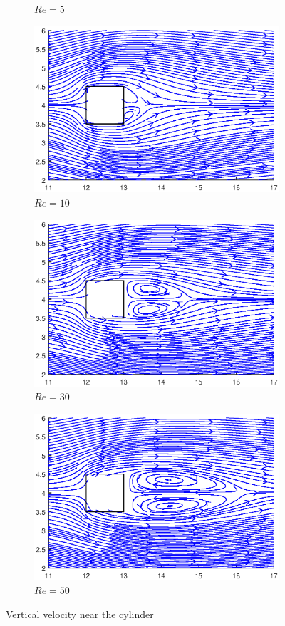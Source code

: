 \begin{figure}[h]
\begin{subfigure}{0.5\textwidth}
		\caption{$Re=5$}
	\end{subfigure}%
	\begin{subfigure}{0.5\textwidth}
		\includegraphics[scale=0.61]{Square/10}
		\caption{$Re=10$}
	\end{subfigure}
	\begin{subfigure}{0.5\textwidth}
		\includegraphics[scale=0.61]{Square/30}
		\caption{$Re=30$}
	\end{subfigure}%
	\begin{subfigure}{0.5\textwidth}
		\includegraphics[scale=0.61]{Square/50}
		\caption{$Re=50$}
	\end{subfigure}
	\caption{Vertical velocity near the cylinder}
	\label{StreamlinesCylinder}
\end{figure}